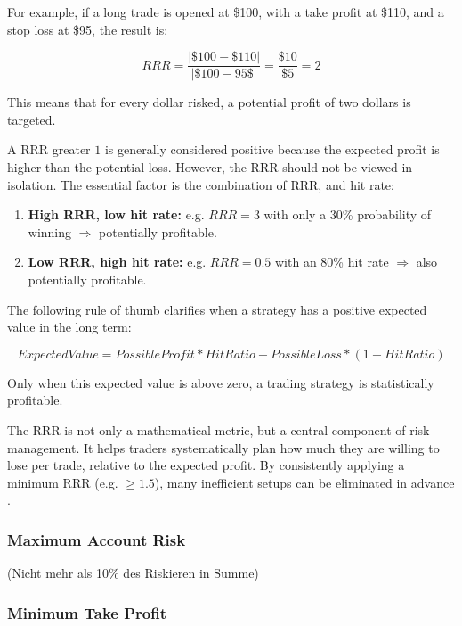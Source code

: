 For example, if a long trade is opened at \$100, with a take profit at \$110, and a stop loss at \$95, the result is:

\begin{equation}
    RRR = \frac{|\$100 - \$110|}{|\$100 - 95\$|} = \frac{\$10}{\$5} = 2
\end{equation}

This means that for every dollar risked, a potential profit of two dollars is targeted.

A RRR greater $1$ is generally considered positive because the expected profit is higher than the potential loss.
However, the RRR should not be viewed in isolation.
The essential factor is the combination of RRR, and hit rate:

\begin{enumerate}
    \item \textbf{High RRR, low hit rate:} e.g.
    $RRR=3$ with only a 30\% probability of winning $\Rightarrow$ potentially profitable.
    \item \textbf{Low RRR, high hit rate:} e.g.
    $RRR=0.5$ with an 80\% hit rate $\Rightarrow$ also potentially profitable.
\end{enumerate}

The following rule of thumb clarifies when a strategy has a positive expected value in the long term:

\begin{equation}
    ExpectedValue = PossibleProfit * HitRatio - PossibleLoss * (1 - HitRatio)
\end{equation}

Only when this expected value is above zero, a trading strategy is statistically profitable.

The RRR is not only a mathematical metric, but a central component of risk management.
It helps traders systematically plan how much they are willing to lose per trade, relative to the expected profit.
By consistently applying a minimum RRR (e.g.
$\ge 1.5$), many inefficient setups can be eliminated in advance \cite{bitpanda-crv}.

\subsubsection{Maximum Account Risk}

(Nicht mehr als 10\% des Riskieren in Summe)

\subsubsection{Minimum Take Profit}

